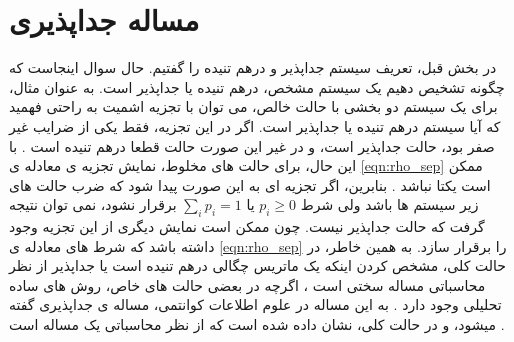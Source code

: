 \section{مساله جداپذیری}

در بخش قبل، تعریف سیستم جداپذیر و درهم تنیده را گفتیم. حال سوال اینجاست که چگونه تشخیص دهیم یک سیستم مشخص، درهم تنیده یا جداپذیر است.
به عنوان مثال، برای یک سیستم دو بخشی با حالت خالص،‌ می توان با تجزیه اشمیت
به راحتی فهمید که آیا سیستم درهم تنیده یا جداپذیر است.
اگر در این تجزیه، فقط یکی از ضرایب غیر صفر بود، حالت جداپذیر است، و در غیر این صورت حالت قطعا درهم تنیده است
\cite{Ekert1995,Sciara2017}.
با این حال، برای حالت های مخلوط، نمایش تجزیه ی معادله ی
\ref{eqn:rho_sep}
ممکن است یکتا نباشد
\cite{Ekert1995,Sciara2017}.
بنابرین، اگر تجزیه ای به این صورت پیدا شود که ضرب حالت های زیر سیستم ها باشد ولی شرط
$p_i \geq 0$
یا
$\sum_i p_i =1$
برقرار نشود، نمی توان نتیجه گرفت که حالت جداپذیر نیست. چون ممکن است نمایش دیگری از این تجزیه وجود داشته باشد که شرط های معادله ی
\ref{eqn:rho_sep}
را برقرار سازد.
به همین خاطر، در حالت کلی، مشخص کردن اینکه یک ماتریس چگالی درهم تنیده است یا جداپذیر از نظر محاسباتی مساله سختی است
\cite{Vedral1997}،
اگرچه در بعضی حالت های خاص،‌ روش های ساده تحلیلی وجود دارد
\cite{horodecki_1996}.
به این مساله در علوم اطلاعات کوانتمی، مساله ی جداپذیری
گفته میشود،
و در حالت کلی، نشان داده شده است که از نظر محاسباتی یک مساله
است
\cite{gharibia_2010}.
